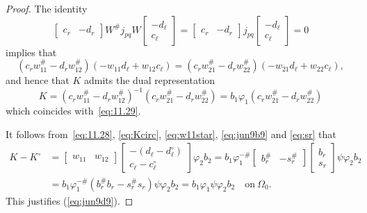\documentclass[12pt,twoside,a4paper]{amsart}
\theoremstyle{definition}
\numberwithin{equation}{section}
\begin{document}
\begin{proof}
The identity
\[
\begin{bmatrix}
  c_r & -d_r
\end{bmatrix}
W^\#j_{pq}W
\begin{bmatrix}
  -d_\ell\\ c_\ell
\end{bmatrix}
=\begin{bmatrix}
  c_r & -d_r
\end{bmatrix}
j_{pq}
\begin{bmatrix}
  -d_\ell\\ c_\ell
\end{bmatrix}=0
\]
implies that
\[
(c_r w_{11}^\#-d_rw_{12}^\#)(-w_{11}d_\ell+w_{12}c_\ell) =
(c_r w_{21}^\#- d_rw_{22}^\#)(-w_{21}d_\ell+w_{22}c_\ell),
\]
and hence that $K$ admits the dual representation
\begin{equation}\label{eq:11.29a}
    K=(c_rw_{11}^\#-d_rw_{12}^\#)^{-1}(c_r
w_{21}^\#-d_rw_{22}^\#)=b_1\varphi_1(c_rw_{21}^\#-d_rw_{22}^\#)
\end{equation}
which coincides with~\eqref{eq:11.29}.

It follows from~\eqref{eq:11.28}, \eqref{eq:Kcirc}, \eqref{eq:w11star},
\eqref{eq:jun9b9} and \eqref{eq:sr} that
\[
\begin{split}
K-K^\circ&=\begin{bmatrix}w_{11}&w_{12}\end{bmatrix}
\begin{bmatrix}-(d_\ell-d_\ell^\circ)\\ c_\ell-c_\ell^\circ\end{bmatrix}
\varphi_2b_2
=b_1\varphi_1^{-\#}
\begin{bmatrix} b_r^\#& -s_r^\#\end{bmatrix}
\begin{bmatrix} b_r\\ s_r\end{bmatrix}\psi\varphi_2b_2\\
&=b_1\varphi_1^{-\#}
 (b_r^\#b_r -s_r^\#s_r)\psi
\varphi_2b_2=b_1\varphi_1\psi \varphi_2b_2\quad\textrm{on}\
\Omega_0.
\end{split}
\]
This justifies (\ref{eq:jun9d9}).


\end{proof}
\end{document}
